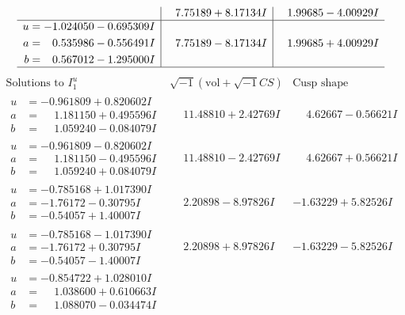 \documentclass[1p]{elsarticle_modified}
\theoremstyle{definition}
\newcommand{\I}{\sqrt{-1}}
\begin{document}
$$\begin{array}{c|c|c}
 & \phantom{-}7.75189 + 8.17134 I & \phantom{-}1.99685 - 4.00929 I \\ \hline\begin{aligned}
u &= -1.024050 - 0.695309 I \\
a &= \phantom{-}0.535986 - 0.556491 I \\
b &= \phantom{-}0.567012 - 1.295000 I\end{aligned}
 & \phantom{-}7.75189 - 8.17134 I & \phantom{-}1.99685 + 4.00929 I\\
 \hline 
 \end{array}$$\newpage$$\begin{array}{c|c|c}  
\text{Solutions to }I^u_{1}& \I (\text{vol} + \sqrt{-1}CS) & \text{Cusp shape}\\
 \hline 
\begin{aligned}
u &= -0.961809 + 0.820602 I \\
a &= \phantom{-}1.181150 + 0.495596 I \\
b &= \phantom{-}1.059240 - 0.084079 I\end{aligned}
 & \phantom{-}11.48810 + 2.42769 I & \phantom{-}4.62667 - 0.56621 I \\ \hline\begin{aligned}
u &= -0.961809 - 0.820602 I \\
a &= \phantom{-}1.181150 - 0.495596 I \\
b &= \phantom{-}1.059240 + 0.084079 I\end{aligned}
 & \phantom{-}11.48810 - 2.42769 I & \phantom{-}4.62667 + 0.56621 I \\ \hline\begin{aligned}
u &= -0.785168 + 1.017390 I \\
a &= -1.76172 - 0.30795 I \\
b &= -0.54057 + 1.40007 I\end{aligned}
 & \phantom{-}2.20898 - 8.97826 I & -1.63229 + 5.82526 I \\ \hline\begin{aligned}
u &= -0.785168 - 1.017390 I \\
a &= -1.76172 + 0.30795 I \\
b &= -0.54057 - 1.40007 I\end{aligned}
 & \phantom{-}2.20898 + 8.97826 I & -1.63229 - 5.82526 I \\ \hline\begin{aligned}
u &= -0.854722 + 1.028010 I \\
a &= \phantom{-}1.038600 + 0.610663 I \\
b &= \phantom{-}1.088070 - 0.034474 I\end{aligned}

\end{array}$$
\end{document}
